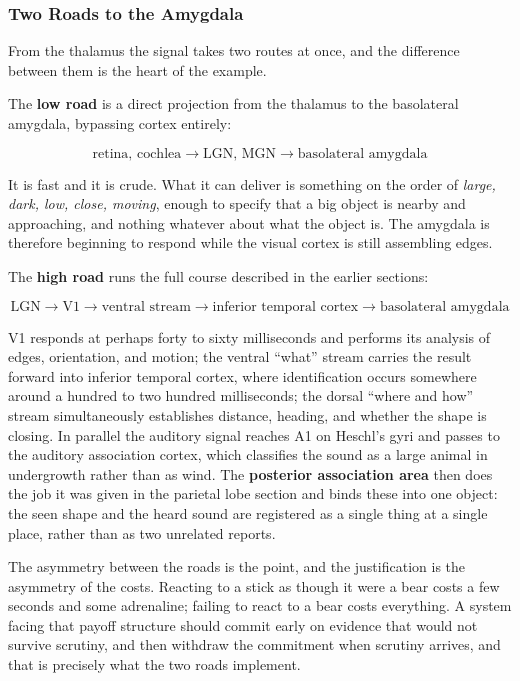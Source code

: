 \documentclass[11pt]{article}
\begin{document}
\subsubsection{Two Roads to the Amygdala}

From the thalamus the signal takes two routes at once, and the difference between them is the heart of the example.

The \textbf{low road} is a direct projection from the thalamus to the basolateral amygdala, bypassing cortex entirely:

\[
\text{retina, cochlea} \rightarrow \text{LGN, MGN} \rightarrow \text{basolateral amygdala}
\]

It is fast and it is crude. What it can deliver is something on the order of \textit{large, dark, low, close, moving}, enough to specify that a big object is nearby and approaching, and nothing whatever about what the object is. The amygdala is therefore beginning to respond while the visual cortex is still assembling edges.

The \textbf{high road} runs the full course described in the earlier sections:

\[
\text{LGN} \rightarrow \text{V1} \rightarrow \text{ventral stream} \rightarrow \text{inferior temporal cortex} \rightarrow \text{basolateral amygdala}
\]

V1 responds at perhaps forty to sixty milliseconds and performs its analysis of edges, orientation, and motion; the ventral ``what'' stream carries the result forward into inferior temporal cortex, where identification occurs somewhere around a hundred to two hundred milliseconds; the dorsal ``where and how'' stream simultaneously establishes distance, heading, and whether the shape is closing. In parallel the auditory signal reaches A1 on Heschl's gyri and passes to the auditory association cortex, which classifies the sound as a large animal in undergrowth rather than as wind. The \textbf{posterior association area} then does the job it was given in the parietal lobe section and binds these into one object: the seen shape and the heard sound are registered as a single thing at a single place, rather than as two unrelated reports.

The asymmetry between the roads is the point, and the justification is the asymmetry of the costs. Reacting to a stick as though it were a bear costs a few seconds and some adrenaline; failing to react to a bear costs everything. A system facing that payoff structure should commit early on evidence that would not survive scrutiny, and then withdraw the commitment when scrutiny arrives, and that is precisely what the two roads implement.
\end{document}
